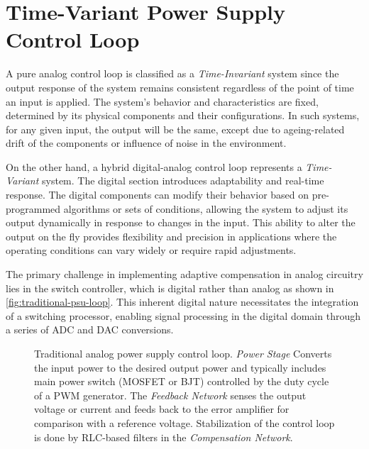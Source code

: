 

\section{Time-Variant Power Supply Control Loop}
\label{subsec:time-variant-comp-network}

A pure analog control loop is classified as a \emph{Time-Invariant} system
since the output response of the system remains consistent regardless
of the point of time an input is applied.
The system's behavior and characteristics are fixed, determined by its physical
components and their configurations.
In such systems, for any given input, the output will be the same, except due to
ageing-related drift of the components or influence of noise in the environment.

On the other hand, a hybrid digital-analog control loop represents
a \emph{Time-Variant} system.
The digital section introduces adaptability and real-time response.
The digital components can modify their behavior based on pre-programmed
algorithms or sets of conditions, allowing the system to adjust its output
dynamically in response to changes in the input.
This ability to alter the output on the fly provides flexibility and precision
in applications where the operating conditions can vary widely or require rapid
adjustments.

The primary challenge in implementing adaptive compensation in analog circuitry
lies in the switch controller, which is digital rather than analog as
shown in \autoref{fig:traditional-psu-loop}.
This inherent digital nature necessitates the integration of a switching
processor, enabling signal processing in the digital domain through a
series of \ac{ADC} and \ac{DAC} conversions.

\begin{figure}
    \centering
    \caption[Comparison of Time-Invariant and Time-Variant ]{
        Traditional analog power supply control loop.
        \emph{Power Stage} Converts the input power to the desired output power
        and typically includes main power switch (\acs{MOSFET} or \acs{BJT})
        controlled by the duty cycle of a PWM generator.
        The \emph{Feedback Network} senses the output voltage or current and
        feeds back to the error amplifier for comparison with a reference
        voltage.
        Stabilization of the control loop is done by \acs{RLC}-based filters in
        the \emph{Compensation Network}.
    }
    \label{fig:traditional-psu-loop}
\end{figure}

